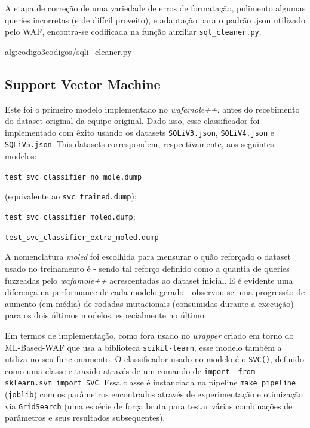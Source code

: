 A etapa de correção de uma variedade de erros de formatação, polimento algumas queries incorretas (e de difícil proveito), e adaptação para o padrão .json utilizado pelo WAF, encontra-se codificada na função auxiliar \verb+sql_cleaner.py+.


\label{sec:codigos:sqli_cleaner}
 {alg:codigo3}{codigos/sqli_cleaner.py}
\bigskip


\subsection{Support Vector Machine}
Este foi o primeiro modelo implementado no \textit{wafamole++}, antes do recebimento do dataset original da equipe original. Dado isso, esse classificador foi implementado com êxito usando os datasets \verb+SQLiV3.json+, \verb+SQLiV4.json+ e \verb+SQLiV5.json+. Tais datasets correspondem, respectivamente, aos seguintes modelos:
\begin{alineas}
\item \verb+test_svc_classifier_no_mole.dump+

(equivalente ao \verb+svc_trained.dump+);
\item \verb+test_svc_classifier_moled.dump+;
\item \verb+test_svc_classifier_extra_moled.dump+ 
\end{alineas}

A nomenclatura \textit{moled} foi escolhida para mensurar o quão reforçado o dataset usado no treinamento é - sendo tal reforço definido como a quantia de queries fuzzeadas pelo \textit{wafamole++} acrescentadas ao dataset inicial. E é evidente uma diferença na performance de cada modelo gerado - observou-se uma progressão de aumento (em média) de rodadas mutacionais (consumidas durante a execução) para os dois últimos modelos, especialmente no último.

Em termos de implementação, como fora usado no \textit{wrapper} criado em torno do ML-Based-WAF que usa a biblioteca \verb+scikit-learn+, esse modelo também a utiliza no seu funcionamento. O classificador usado no modelo é o \verb+SVC()+, definido como uma classe e trazido através de um comando de \verb+import+ - \verb+from sklearn.svm import SVC+. Essa classe é instanciada na pipeline \verb+make_pipeline+ (\verb+joblib+) com os parâmetros encontrados através de experimentação e otimização via \verb+GridSearch+ (uma espécie de força bruta para testar várias combinações de parâmetros e seus resultados subsequentes).

